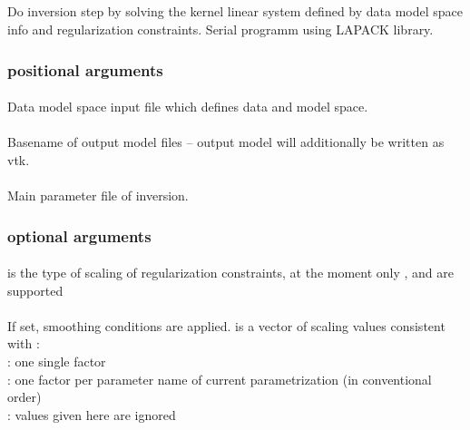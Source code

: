 \subsection{} \label{programs_scripts,sec:bin_prog,sec:sol_Ker_Sys}
Do inversion step by solving the kernel linear system defined by data model space info and regularization constraints. Serial programm using LAPACK library.

\subsubsection{positional arguments}
\paragraph{}
Data model space input file which defines data and model space.
\paragraph{}
Basename of output model files -- output model will additionally be written as vtk.
\paragraph{}
Main parameter file of inversion.
\subsubsection{optional arguments}
\paragraph{}
 is the type of scaling of regularization constraints, at the moment only 
,  and  are supported
\paragraph{}
If set, smoothing conditions are applied.  is a vector of scaling values consistent 
with :\\
: one single factor\\
: one factor per parameter name of current parametrization (in conventional order)\\
 : values given here are ignored
